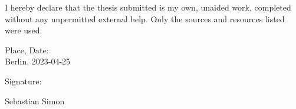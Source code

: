 I hereby declare that the thesis submitted is my own, unaided work, completed without any unpermitted external help.
Only the sources and resources listed were used.

Place, Date:\\
Berlin, 2023-04-25

Signature:

\vspace{3em}

Sebastian Simon
